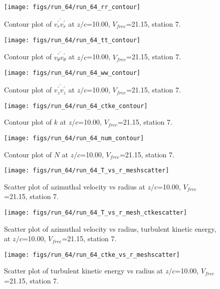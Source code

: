 \begin{figure}[H]
\centering
\texttt{[image: figs/run\_64/run\_64\_rr\_contour]}
\caption{Contour plot of $\overline{v_{r}^{\prime} v_{r}^{\prime}}$ at $z/c$=10.00, $V_{free}$=21.15, station 7.}
\end{figure}


\begin{figure}[H]
\centering
\texttt{[image: figs/run\_64/run\_64\_tt\_contour]}
\caption{Contour plot of $\overline{v_{\theta}^{\prime} v_{\theta}^{\prime}}$ at $z/c$=10.00, $V_{free}$=21.15, station 7.}
\end{figure}


\begin{figure}[H]
\centering
\texttt{[image: figs/run\_64/run\_64\_ww\_contour]}
\caption{Contour plot of $\overline{v_{z}^{\prime} v_{z}^{\prime}}$ at $z/c$=10.00, $V_{free}$=21.15, station 7.}
\end{figure}


\begin{figure}[H]
\centering
\texttt{[image: figs/run\_64/run\_64\_ctke\_contour]}
\caption{Contour plot of $k$ at $z/c$=10.00, $V_{free}$=21.15, station 7.}
\end{figure}


\begin{figure}[H]
\centering
\texttt{[image: figs/run\_64/run\_64\_num\_contour]}
\caption{Contour plot of $N$ at $z/c$=10.00, $V_{free}$=21.15, station 7.}
\end{figure}


\begin{figure}[H]
\centering
\texttt{[image: figs/run\_64/run\_64\_T\_vs\_r\_meshscatter]}
\caption{Scatter plot of azimuthal velocity vs radius at $z/c$=10.00, $V_{free}$=21.15, station 7.}
\end{figure}


\begin{figure}[H]
\centering
\texttt{[image: figs/run\_64/run\_64\_T\_vs\_r\_mesh\_ctkescatter]}
\caption{Scatter plot of azimuthal velocity vs radius, turbulent kinetic energy, at $z/c$=10.00, $V_{free}$=21.15, station 7.}
\end{figure}


\begin{figure}[H]
\centering
\texttt{[image: figs/run\_64/run\_64\_ctke\_vs\_r\_meshscatter]}
\caption{Scatter plot of turbulent kinetic energy vs radius at $z/c$=10.00, $V_{free}$=21.15, station 7.}
\end{figure}


